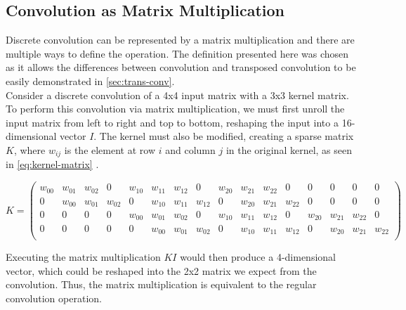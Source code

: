 \subsection{Convolution as Matrix Multiplication} \label{sec:conv-matrix}
 
Discrete convolution can be represented by a matrix multiplication and there are multiple ways to define the operation. The definition presented here was chosen as it allows the differences between convolution and transposed convolution to be easily demonstrated in \autoref{sec:trans-conv}. \\

\noindent Consider a discrete convolution of a 4x4 input matrix with a 3x3 kernel matrix. To perform this convolution via matrix multiplication, we must first unroll the input matrix from left to right and top to bottom, reshaping the input into a 16-dimensional vector $I$. The kernel must also be modified, creating a sparse matrix $K$, where $w_{ij}$ is the element at row $i$ and column $j$ in the original kernel, as seen in \autoref{eq:kernel-matrix} \cite{conv-math}.

\begin{equation}
\label{eq:kernel-matrix}
    K = 
    \left(
    \begin{smallmatrix}
    \textit{$w_{00}$} & \textit{$w_{01}$} & \textit{$w_{02}$} & 0 & \textit{$w_{10}$} & \textit{$w_{11}$} & \textit{$w_{12}$} & 0 & \textit{$w_{20}$} & \textit{$w_{21}$} & \textit{$w_{22}$} & 0 & 0 & 0 & 0 & 0 \\
    0 & \textit{$w_{00}$} & \textit{$w_{01}$} & \textit{$w_{02}$} & 0 & \textit{$w_{10}$} & \textit{$w_{11}$} & \textit{$w_{12}$} & 0 & \textit{$w_{20}$} & \textit{$w_{21}$} & \textit{$w_{22}$} & 0 & 0 & 0 & 0 \\
    0 & 0 & 0 & 0 & \textit{$w_{00}$} & \textit{$w_{01}$} & \textit{$w_{02}$} & 0 & \textit{$w_{10}$} & \textit{$w_{11}$} & \textit{$w_{12}$} & 0 & \textit{$w_{20}$} & \textit{$w_{21}$} & \textit{$w_{22}$} & 0 \\
    0 & 0 & 0 & 0 & 0 & \textit{$w_{00}$} & \textit{$w_{01}$} & \textit{$w_{02}$} & 0 & \textit{$w_{10}$} & \textit{$w_{11}$} & \textit{$w_{12}$} & 0 & \textit{$w_{20}$} & \textit{$w_{21}$} & \textit{$w_{22}$} \\
    \end{smallmatrix}
    \right)
\end{equation} 

\noindent Executing the matrix multiplication $KI$ would then produce a 4-dimensional vector, which could be reshaped into the 2x2 matrix we expect from the convolution. Thus, the matrix multiplication is equivalent to the regular convolution operation.

